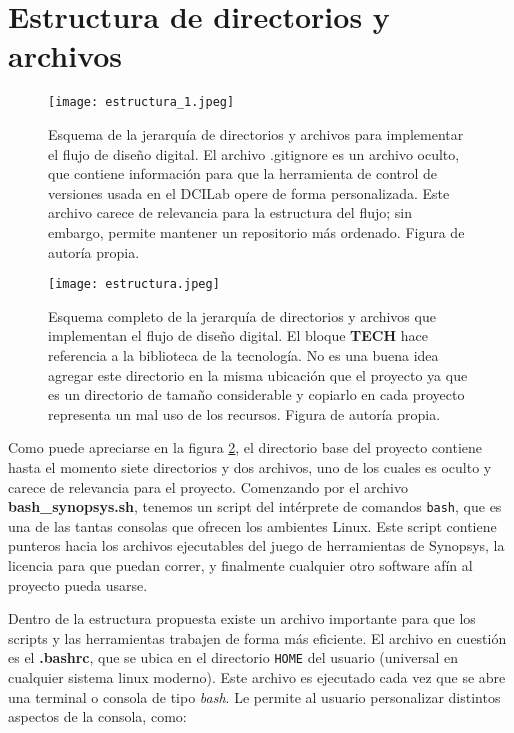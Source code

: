\section{Estructura de directorios y archivos}

\begin{figure}[h]
\texttt{[image: estructura\_1.jpeg]}
\centering
\caption{Esquema de la jerarquía de directorios y archivos para implementar el flujo de diseño digital. El archivo .gitignore es un archivo oculto, que contiene información para que la herramienta de control de versiones usada en el DCILab opere de forma personalizada. Este archivo carece de relevancia para la estructura del flujo; sin embargo, permite mantener un repositorio más ordenado. Figura de autoría propia.}
\label{directorios}
\end{figure}


\begin{figure}[h]
\texttt{[image: estructura.jpeg]}
\centering
\caption{Esquema completo de la jerarquía de directorios y archivos que implementan el flujo de diseño digital. El bloque \textbf{TECH} hace referencia a la biblioteca de la tecnología. No es una buena idea agregar este directorio en la misma ubicación que el proyecto ya que es un directorio de tamaño considerable y copiarlo en cada proyecto representa un mal uso de los recursos. Figura de autoría propia.}
\label{directorios}
\end{figure}

Como puede apreciarse en la figura \ref{directorios}, el directorio base del proyecto contiene hasta el momento siete directorios y dos archivos, uno de los cuales es oculto y carece de relevancia para el proyecto. Comenzando por el archivo \textbf{bash\_synopsys.sh}, tenemos un script del intérprete de comandos \texttt{bash}, que es una de las tantas consolas que ofrecen los ambientes Linux. Este script contiene punteros hacia los archivos ejecutables del juego de herramientas de Synopsys, la licencia para que puedan correr, y finalmente cualquier otro software afín al proyecto pueda usarse.

Dentro de la estructura propuesta existe un archivo importante para que los scripts y las herramientas trabajen de forma más eficiente. El archivo en cuestión es el \textbf{.bashrc}, que se ubica en el directorio \texttt{HOME} del usuario (universal en cualquier sistema linux moderno). Este archivo es ejecutado cada vez que se abre una terminal o consola de tipo \textit{bash}. Le permite al usuario personalizar distintos aspectos de la consola, como:

